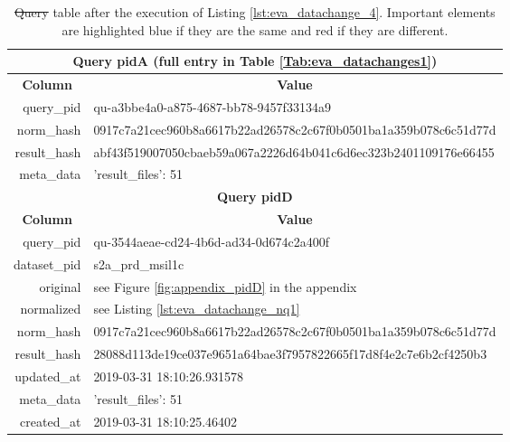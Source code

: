 \documentclass[draft,final]{vutinfth} %
\providecommand{\DIFaddtex}[1]{{\protect\color{blue}\uwave{#1}}} %
\providecommand{\DIFdeltex}[1]{{\protect\color{red}\sout{#1}}}                      %
\providecommand{\DIFaddFL}[1]{\DIFadd{#1}} %
\providecommand{\DIFdelFL}[1]{\DIFdel{#1}} %
\providecommand{\DIFaddbeginFL}{} %
\providecommand{\DIFaddendFL}{} %
\providecommand{\DIFdelbeginFL}{} %
\providecommand{\DIFdelendFL}{} %
\providecommand{\DIFadd}[1]{\texorpdfstring{\DIFaddtex{#1}}{#1}} %
\providecommand{\DIFdel}[1]{\texorpdfstring{\DIFdeltex{#1}}{}} %
\begin{document}
\begin{enumerate}
	\begin{table}[]
		\caption{\DIFdelbeginFL \DIFdelFL{Query }\DIFdelendFL \DIFaddbeginFL \textit{\DIFaddFL{Query}} \DIFaddendFL table after the execution of Listing \ref{lst:eva_datachange_4}. Important elements are highlighted blue if they are the same and red if they are different.}
		\centering
		\begin{tabular}{|r|l|}
			\hline \multicolumn{2}{|c|}{\textbf{Query pidA (full entry in Table \ref{Tab:eva_datachanges1})}} \\
			\hline \multicolumn{1}{|c|}{\textbf{Column}}  &  \multicolumn{1}{c|}{\textbf{Value}} \\ \hline
			query\_pid & {\color{red}qu-a3bbe4a0-a875-4687-bb78-9457f33134a9}  \\ 
			norm\_hash & {\color{blue}0917c7a21cec960b8a6617b22ad26578c2c67f0b0501ba1a359b078c6c51d77d}  \\
			result\_hash & {\color{red}abf43f519007050cbaeb59a067a2226d64b041c6d6ec323b2401109176e66455}   \\
			meta\_data & {'result\_files': 51}  \\
			\hline \multicolumn{2}{|c|}{\textbf{Query pidD}} \\
			\hline \multicolumn{1}{|c|}{\textbf{Column}}  &  \multicolumn{1}{c|}{\textbf{Value}} \\ \hline
			query\_pid & { \color{red} qu-3544aeae-cd24-4b6d-ad34-0d674c2a400f}  \\ 
			dataset\_pid & s2a\_prd\_msil1c  \\ 
			original & see Figure \ref{fig:appendix_pidD} in the appendix \\
			normalized & see Listing \ref{lst:eva_datachange_nq1}  \\
			norm\_hash & {\color{blue}0917c7a21cec960b8a6617b22ad26578c2c67f0b0501ba1a359b078c6c51d77d}  \\
			result\_hash & {\color{red}28088d113de19ce037e9651a64bae3f7957822665f17d8f4e2c7e6b2cf4250b3}  \\
			updated\_at & 2019-03-31 18:10:26.931578   \\
			meta\_data & {'result\_files': 51}  \\
			created\_at & 2019-03-31 18:10:25.46402   \\ \hline
		\end{tabular}
		\label{Tab:eva_datachanges5}
	\end{table}
\end{enumerate}
\end{document}
